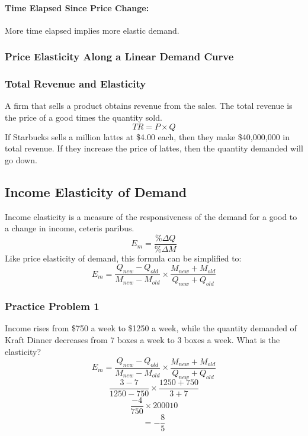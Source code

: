 \documentclass{article}
\begin{document}
\paragraph{Time Elapsed Since Price Change:}
More time elapsed implies more elastic demand.

\subsubsection{Price Elasticity Along a Linear Demand Curve}
\begin{center}
\end{center}

\subsubsection{Total Revenue and Elasticity}
A firm that sells a product obtains revenue from the sales. The total revenue
is the price of a good times the quantity sold.
\[ TR = P \times Q \]
If Starbucks sells a million lattes at \$4.00 each, then they make \$40,000,000
in total revenue. If they increase the price of lattes, then the quantity
demanded will go down.

\subsection{Income Elasticity of Demand}
Income elasticity is a measure of the responsiveness of the demand for a good to a change in income, ceteris paribus.
\[ E_{m} = \frac{\%\Delta Q}{\%\Delta M} \]
Like price elasticity of demand, this formula can be simplified to:
\[ E_{m} = \frac{Q_{new}-Q_{old}}{M_{new}-M_{old}}\times
           \frac{M_{new}+M_{old}}{Q_{new}+Q_{old}} \]

\subsubsection{Practice Problem 1}
Income rises from \$750 a week to \$1250 a week, while the quantity demanded
of Kraft Dinner decreases from 7 boxes a week to 3 boxes a week. What is the
elasticity?
\[ E_{m} = \frac{Q_{new}-Q_{old}}{M_{new}-M_{old}}\times
           \frac{M_{new}+M_{old}}{Q_{new}+Q_{old}} \]
\[ \frac{3-7}{1250-750}\times\frac{1250+750}{3+7} \]
\[ \frac{-4}{750}\times{2000}{10} \]
\[ = -\frac{8}{5} \]
\end{document}
